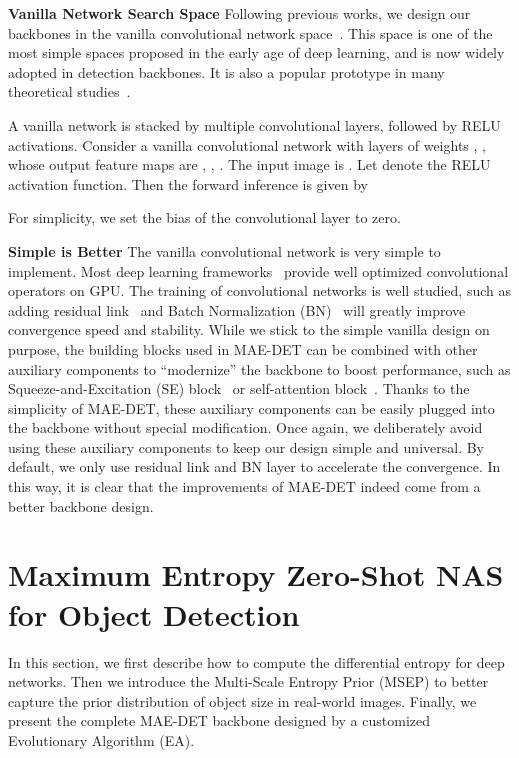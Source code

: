 \documentclass[nohyperref]{article}
\theoremstyle{plain}
\theoremstyle{definition}
\theoremstyle{remark}
\begin{document}
\noindent\textbf{Vanilla Network Search Space} Following previous works, we design our backbones in the vanilla convolutional network space~\citep{detnet,detnas,spinenet,zennas}. This space is one of the most simple spaces proposed in the early age of deep learning, and is now widely adopted in detection backbones. It is also a popular prototype in many theoretical studies~\citep{exponential,bounding,complexity}.

A vanilla network is stacked by multiple convolutional layers, followed by RELU activations. Consider a vanilla convolutional network with  layers of weights ,  ,   whose output feature maps are , , . The input image is . Let  denote the RELU activation function. Then the forward inference is given by

For simplicity, we set the bias of the convolutional layer to zero.

\noindent\textbf{Simple is Better} The vanilla convolutional network is very simple to implement. Most deep learning frameworks~\cite{Pytorch_NIPS2019,tensorflow2015-whitepaper} provide well optimized convolutional operators on GPU. The training of convolutional networks is well studied, such as adding residual link~\citep{resnet} and Batch Normalization (BN)~\citep{bn} will greatly improve convergence speed and stability. While we stick to the simple vanilla design on purpose, the building blocks used in MAE-DET can be combined with other auxiliary components to ``modernize'' the backbone to boost performance, such as Squeeze-and-Excitation (SE) block~\citep{hu2018squeeze} or self-attention block~\citep{zhao2020exploring}. Thanks to the simplicity of MAE-DET, these auxiliary components can be easily plugged into the backbone without special modification. Once again, we deliberately avoid using these auxiliary components to keep our design simple and universal. By default, we only use residual link and BN layer to accelerate the convergence. In this way, it is clear that the improvements of MAE-DET indeed come from a better backbone design.



\section{Maximum Entropy Zero-Shot NAS for Object Detection}

In this section, we first describe how to compute the differential entropy for deep networks. Then we introduce the Multi-Scale Entropy Prior (MSEP) to better capture the prior distribution of object size in real-world images. Finally, we present the complete MAE-DET backbone designed by a customized Evolutionary Algorithm (EA).
\end{document}

